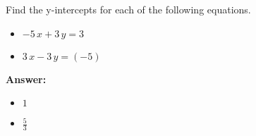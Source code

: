  Find the y-intercepts for each of the following equations. \begin{itemize}\item \( -5 \, x + 3 \, y = 3 \)\item \( 3 \, x - 3 \, y = \left(-5\right) \)\end{itemize}

        \textbf{Answer:} \begin{itemize}\item \( 1 \)\item \( \frac{5}{3} \)\end{itemize}
